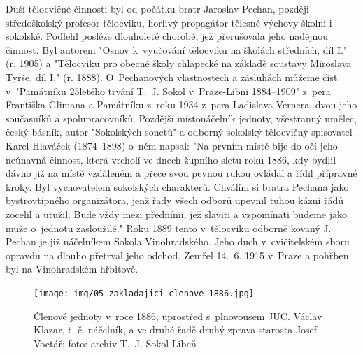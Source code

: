 \documentclass[a5paper, 11pt, twoside]{article}
\begin{document}
Duší tělocvičné činnosti byl od počátku bratr Jaroslav Pechan, později středoškolský profesor tělocviku, horlivý propagátor tělesné výchovy školní i sokolské. Podlehl posléze dlouholeté chorobě, jež přerušovala jeho nadějnou činnost. Byl autorem "Osnov k~vyučování tělocviku na školách středních, díl I." (r. 1905) a "Tělocviku pro obecné školy chlapecké na základě soustavy Miroslava Tyrše, díl I." (r. 1888). O~Pechanových vlastnostech a zásluhách můžeme číst v~"Památníku 25letého trvání T.~J.  Sokol v~Praze-Libni 1884–⁠⁠⁠⁠⁠⁠1909" z~pera Františka Glimana a Památníku z~roku 1934 z~pera Ladislava Vernera, dvou jeho současníků a spolupracovníků. Pozdější místonáčelník jednoty, všestranný umělec, český básník, autor "Sokolských sonetů" a odborný sokolský tělocvičný spisovatel Karel Hlaváček (1874–1898) o~něm napsal: "Na prvním místě bije do očí jeho neúnavná činnost, která vrcholí ve dnech župního sletu roku 1886, kdy bydlil dávno již na místě vzdáleném a přece svou pevnou rukou ovládal a řídil přípravné kroky. Byl vychovatelem sokolských  charakterů.  Chválím si bratra Pechana jako bystrovtipného organizátora, jenž řady všech odborů upevnil tuhou kázní řádů zocelil a utužil. Bude vždy mezi předními, jež slaviti a vzpomínati budeme jako muže o~jednotu zasloužilé." Roku 1889 tento v~tělocviku odborně kovaný J. Pechan je již náčelníkem Sokola Vinohradského. Jeho duch v~cvičitelském sboru opravdu na dlouho přetrval jeho odchod. Zemřel 14.~6. 1915 v~Praze a pohřben byl na Vinohradském hřbitově.

\begin{figure}[h!]
  \centering
   \texttt{[image: img/05\_zakladajici\_clenove\_1886.jpg]}
  \caption*{Členové jednoty v~roce 1886, uprostřed s~plnovousem JUC. Václav Klazar, t. č. náčelník, a ve druhé řadě druhý zprava starosta Josef Voctář; foto: archiv T.~J. Sokol Libeň}
\end{figure}
\end{document}
